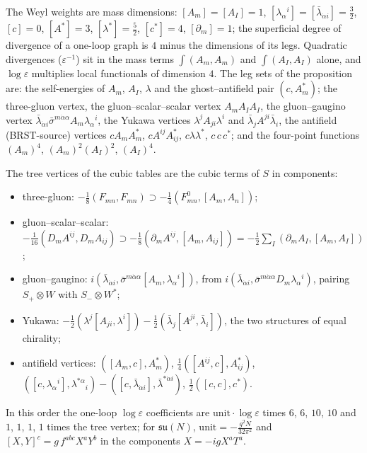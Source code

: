 \begin{remark}
The Weyl weights are mass dimensions: $[A_m]=[A_I]=1$, $[\lambda_\alpha{}^i]=[\bar\lambda_{\dot\alpha i}]=\tfrac32$, $[c]=0$, $[A^*]=3$, $[\lambda^*]=\tfrac52$, $[c^*]=4$, $[\partial_m]=1$; the superficial degree of divergence of a one-loop graph is $4$ minus the dimensions of its legs. Quadratic divergences ($\varepsilon^{-1}$) sit in the mass terms $\int(A_m,A_m)$ and $\int(A_I,A_I)$ alone, and $\log\varepsilon$ multiplies local functionals of dimension $4$. The leg sets of the proposition are: the self-energies of $A_m$, $A_I$, $\lambda$ and the ghost--antifield pair $(c,A^*_m)$; the three-gluon vertex, the gluon--scalar--scalar vertex $A_mA_IA_I$, the gluon--gaugino vertex $\bar\lambda_{\dot\alpha i}\bar\sigma^{m\dot\alpha\alpha}A_m\lambda_\alpha{}^i$, the Yukawa vertices $\lambda^jA_{ji}\lambda^i$ and $\bar\lambda_jA^{ji}\bar\lambda_i$, the antifield (BRST-source) vertices $cA_mA^*_m$, $cA^{ij}A^*_{ij}$, $c\lambda\lambda^*$, $c\,c\,c^*$; and the four-point functions $(A_m)^4$, $(A_m)^2(A_I)^2$, $(A_I)^4$.
\end{remark}

\begin{remark}
The tree vertices of the cubic tables are the cubic terms of $S$ in components:
\begin{itemize}
\item three-gluon: $-\tfrac18(F_{mn},F_{mn})\supset-\tfrac14(F^0_{mn},[A_m,A_n])$;
\item gluon--scalar--scalar: $-\tfrac1{16}(D_mA^{ij},D_mA_{ij})\supset-\tfrac18(\partial_mA^{ij},[A_m,A_{ij}])=-\tfrac12\sum_I(\partial_mA_I,[A_m,A_I])$;
\item gluon--gaugino: $i(\bar\lambda_{\dot\alpha i},\bar\sigma^{m\dot\alpha\alpha}[A_m,\lambda_\alpha{}^i])$, from $i(\bar\lambda_{\dot\alpha i},\bar\sigma^{m\dot\alpha\alpha}D_m\lambda_\alpha{}^i)$, pairing $S_+\otimes W$ with $S_-\otimes W^*$;
\item Yukawa: $-\tfrac12(\lambda^j[A_{ji},\lambda^i])-\tfrac12(\bar\lambda_j[A^{ji},\bar\lambda_i])$, the two structures of equal chirality;
\item antifield vertices: $([A_m,c],A^*_m)$, $\tfrac14([A^{ij},c],A^*_{ij})$, $([c,\lambda_\alpha{}^i],\lambda^{*\alpha}{}_i)-([c,\bar\lambda_{\dot\alpha i}],\bar\lambda^{*\dot\alpha i})$, $\tfrac12([c,c],c^*)$.
\end{itemize}
In this order the one-loop $\log\varepsilon$ coefficients are $\mathrm{unit}\cdot\log\varepsilon$ times $6$, $6$, $10$, $10$ and $1$, $1$, $1$, $1$ times the tree vertex; for $\mathfrak{su}(N)$, $\mathrm{unit}=-\frac{g^2N}{32\pi^2}$ and $[X,Y]^c=g\,f^{abc}X^aY^b$ in the components $X=-igX^aT^a$.
\end{remark}

